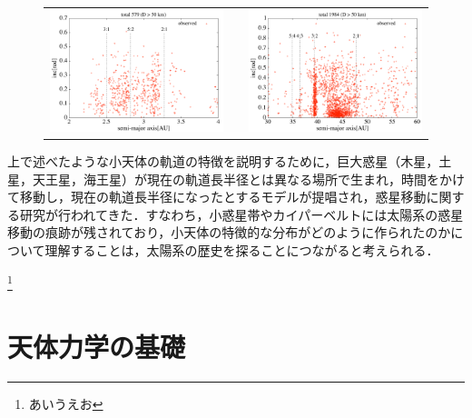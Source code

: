 \documentclass[11pt,a4paper,oneside,onecolumn]{jreport}
\begin{document}
\begin{figure}[H]
\begin{tabular}{ccc}
\begin{minipage}[t]{0.45\hsize}
\centering
\includegraphics[width=8cm]{./image/mainbelt_inc.pdf}
\end{minipage} &
\begin{minipage}[t]{0.1\hsize}
\end{minipage} &
\begin{minipage}[t]{0.45\hsize}
\centering
\includegraphics[width=8cm]{./image/kuiperbelt_inc.pdf}
\end{minipage}\\
%
\end{tabular}
\caption{\label{fig:inc}}
\end{figure}



上で述べたような小天体の軌道の特徴を説明するために，巨大惑星（木星，土星，天王星，海王星）が現在の軌道長半径とは異なる場所で生まれ，時間をかけて移動し，現在の軌道長半径になったとするモデルが提唱され，惑星移動に関する研究が行われてきた．すなわち，小惑星帯やカイパーベルトには太陽系の惑星移動の痕跡が残されており，小天体の特徴的な分布がどのように作られたのかについて理解することは，太陽系の歴史を探ることにつながると考えられる．

\footnote[1]{あいうえお}


\chapter{天体力学の基礎}
\end{document}
